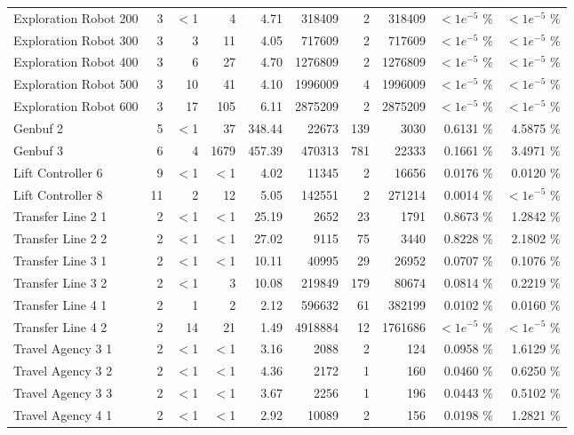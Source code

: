 \begin{tabular}{|l|r|rrr|rrr|rr|}
  Exploration Robot 200 &   3 & $<$1 & 4 & 4.71 & 318409 &   2 & 318409 & $<1e^{-5}$ \% & $<1e^{-5}$ \% \\ 
  Exploration Robot 300 &   3 & 3 & 11 & 4.05 & 717609 &   2 & 717609 & $<1e^{-5}$ \% & $<1e^{-5}$ \% \\ 
  Exploration Robot 400 &   3 & 6 & 27 & 4.70 & 1276809 &   2 & 1276809 & $<1e^{-5}$ \% & $<1e^{-5}$ \% \\ 
  Exploration Robot 500 &   3 & 10 & 41 & 4.10 & 1996009 &   4 & 1996009 & $<1e^{-5}$ \% & $<1e^{-5}$ \% \\ 
  Exploration Robot 600 &   3 & 17 & 105 & 6.11 & 2875209 &   2 & 2875209 & $<1e^{-5}$ \% & $<1e^{-5}$ \% \\ 
  Genbuf 2 &   5 & $<$1 & 37 & 348.44 & 22673 & 139 & 3030 &  0.6131 \% &    4.5875 \% \\ 
  Genbuf 3 &   6 & 4 & 1679 & 457.39 & 470313 & 781 & 22333 &  0.1661 \% &    3.4971 \% \\ 
  Lift Controller 6 &   9 & $<$1 & $<$1 & 4.02 & 11345 &   2 & 16656 &  0.0176 \% &    0.0120 \% \\ 
  Lift Controller 8 &  11 & 2 & 12 & 5.05 & 142551 &   2 & 271214 &  0.0014 \% & $<1e^{-5}$ \% \\ 
  Transfer Line 2 1 &   2 & $<$1 & $<$1 & 25.19 & 2652 &  23 & 1791 &  0.8673 \% &    1.2842 \% \\ 
  Transfer Line 2 2 &   2 & $<$1 & $<$1 & 27.02 & 9115 &  75 & 3440 &  0.8228 \% &    2.1802 \% \\ 
  Transfer Line 3 1 &   2 & $<$1 & $<$1 & 10.11 & 40995 &  29 & 26952 &  0.0707 \% &    0.1076 \% \\ 
  Transfer Line 3 2 &   2 & $<$1 & 3 & 10.08 & 219849 & 179 & 80674 &  0.0814 \% &    0.2219 \% \\ 
  Transfer Line 4 1 &   2 & 1 & 2 & 2.12 & 596632 &  61 & 382199 &  0.0102 \% &    0.0160 \% \\ 
  Transfer Line 4 2 &   2 & 14 & 21 & 1.49 & 4918884 &  12 & 1761686 & $<1e^{-5}$ \% & $<1e^{-5}$ \% \\ 
  Travel Agency 3 1 &   2 & $<$1 & $<$1 & 3.16 & 2088 &   2 & 124 &  0.0958 \% &    1.6129 \% \\ 
  Travel Agency 3 2 &   2 & $<$1 & $<$1 & 4.36 & 2172 &   1 & 160 &  0.0460 \% &    0.6250 \% \\ 
  Travel Agency 3 3 &   2 & $<$1 & $<$1 & 3.67 & 2256 &   1 & 196 &  0.0443 \% &    0.5102 \% \\ 
  Travel Agency 4 1 &   2 & $<$1 & $<$1 & 2.92 & 10089 &   2 & 156 &  0.0198 \% &    1.2821 \% \\ 

\end{tabular}
